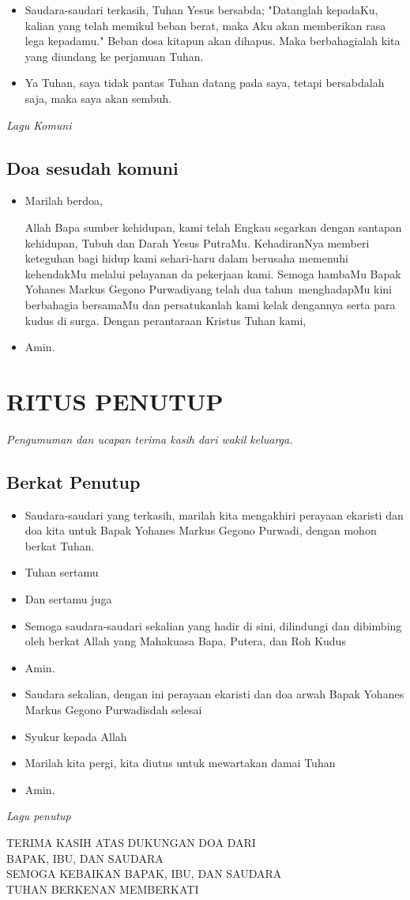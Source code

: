 \documentclass[10pt,landscape]{article}
\makeatletter
\newcommand{\lagu}[1]{%
  {\parindent \z@ 
    \interlinepenalty\@M \slshape \mdseries \large \textit{#1}\par\nobreak \vskip 10\p@ }}
\newcommand{\keterangan}[1]{%
  {\parindent \z@ 
    \interlinepenalty\@M \slshape \mdseries \textit{#1}\par\nobreak \vskip 10\p@ }}
\newcommand{\BU}[1]{\begin{itemize} \item[U:] #1 \end{itemize}}
\newcommand{\BI}[1]{\begin{itemize} \item[I:] #1 \end{itemize}}
\newcommand{\namaalm}{Bapak Yohanes Markus Gegono Purwadi}
\newcommand{\Peringatan}{dua tahun}
\makeatother
\begin{document}
\begin{multicols}{3}
\BI{Saudara-saudari terkasih, Tuhan Yesus bersabda; "Datanglah kepadaKu, kalian yang telah memikul beban berat, maka Aku akan memberikan rasa lega kepadamu." Beban dosa kitapun akan dihapus. Maka berbahagialah kita yang diundang ke perjamuan Tuhan.}

\BU{Ya Tuhan, saya tidak pantas Tuhan datang pada saya, tetapi bersabdalah saja, maka saya akan sembuh.}

\lagu{Lagu Komuni}

\subsection*{Doa sesudah komuni}

\BI{Marilah berdoa,

Allah Bapa sumber kehidupan, kami telah Engkau segarkan dengan santapan kehidupan, Tubuh dan Darah Yesus PutraMu. KehadiranNya memberi keteguhan bagi hidup kami sehari-haru dalam berusaha memenuhi kehendakMu melalui pelayanan da  pekerjaan kami. Semoga hambaMu \namaalm yang telah \Peringatan ~menghadapMu kini berbahagia bersamaMu dan persatukanlah kami kelak dengannya serta para kudus di surga. Dengan perantaraan Kristus Tuhan kami,}

\BU{Amin.}

\section*{RITUS PENUTUP}

\keterangan{Pengumuman dan ucapan terima kasih dari wakil keluarga.}

\subsection*{Berkat Penutup}

\BI{Saudara-saudari yang terkasih, marilah kita mengakhiri perayaan ekaristi dan doa kita untuk \namaalm, dengan mohon berkat Tuhan.}

\BI{Tuhan sertamu}

\BU{Dan sertamu juga}

\BI{Semoga saudara-saudari sekalian yang hadir di sini, dilindungi dan dibimbing oleh berkat Allah yang Mahakuasa Bapa, Putera, dan Roh Kudus}

\BU{Amin.}

\BI{Saudara sekalian, dengan ini perayaan ekaristi dan doa arwah \namaalm sdah selesai}

\BU{Syukur kepada Allah}

\BI{Marilah kita pergi, kita diutus untuk mewartakan damai Tuhan}

\BU{Amin.}

\lagu{Lagu penutup}

\begin{center}
TERIMA KASIH ATAS DUKUNGAN DOA DARI\\
BAPAK, IBU, DAN SAUDARA\\
SEMOGA KEBAIKAN BAPAK, IBU, DAN SAUDARA\\
TUHAN BERKENAN MEMBERKATI
\end{center}
\end{multicols}
\end{document}
